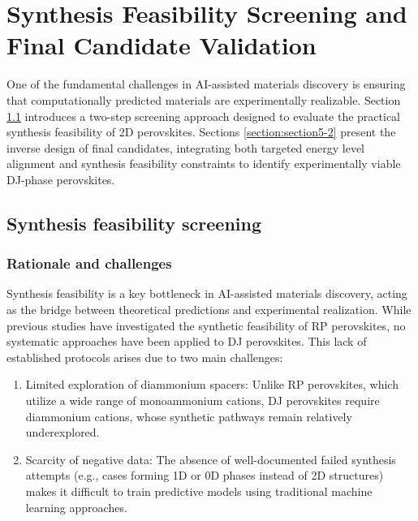 \chapter[Synthesis Feasibility Screening and Final Candidate Validation]{Synthesis Feasibility Screening and Final Candidate Validation}\label{c:result-2}

One of the fundamental challenges in AI-assisted materials discovery is ensuring that computationally predicted materials are experimentally realizable. Section \ref{section:section5-1} introduces a two-step screening approach designed to evaluate the practical synthesis feasibility of 2D perovskites. Sections \ref{section:section5-2} present the inverse design of final candidates, integrating both targeted energy level alignment and synthesis feasibility constraints to identify experimentally viable DJ-phase perovskites.

\section{Synthesis feasibility screening}\label{section:section5-1}

\subsection{Rationale and challenges}
Synthesis feasibility is a key bottleneck in AI-assisted materials discovery, acting as the bridge between theoretical predictions and experimental realization\cite{RN409,RN521}. While previous studies have investigated the synthetic feasibility of RP perovskites\cite{RN315,RN283}, no systematic approaches have been applied to DJ perovskites. This lack of established protocols arises due to two main challenges:

\begin{enumerate}
    \item Limited exploration of diammonium spacers: Unlike RP perovskites, which utilize a wide range of monoammonium cations, DJ perovskites require diammonium cations, whose synthetic pathways remain relatively underexplored.
    \item Scarcity of negative data: The absence of well-documented failed synthesis attempts (e.g., cases forming 1D or 0D phases instead of 2D structures) makes it difficult to train predictive models using traditional machine learning approaches\cite{RN422,RN592}. 
\end{enumerate}

